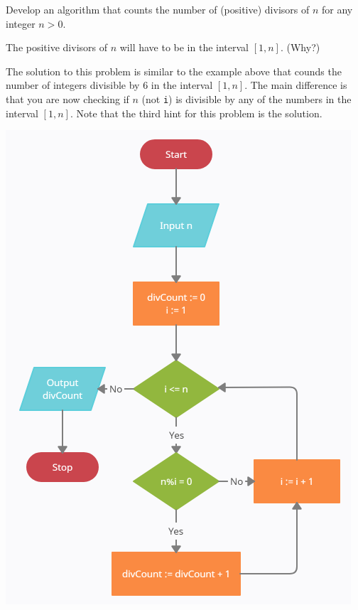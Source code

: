 \documentclass{ximera}
\begin{document}
\begin{question}
	Develop an algorithm that counts the number of (positive) divisors of $n$ for any integer $n>0$. 
	\begin{hint}
		The positive divisors of $n$ will have to be in the interval $[1,n]$. (Why?)
	\end{hint}
	\begin{hint}
		The solution to this problem is similar to the example above that counds the number of integers divisible by 6 in the interval $[1,n]$. The main difference is that you are now checking if $n$ (not \verb|i|) is divisible by any of the numbers in the interval $[1,n]$. Note that the third hint for this problem is the solution.
	\end{hint}

	\begin{hint}
		\begin{center}
			\includegraphics{divcount.png}
		\end{center}
	\end{hint}
\end{question}
\end{document}
